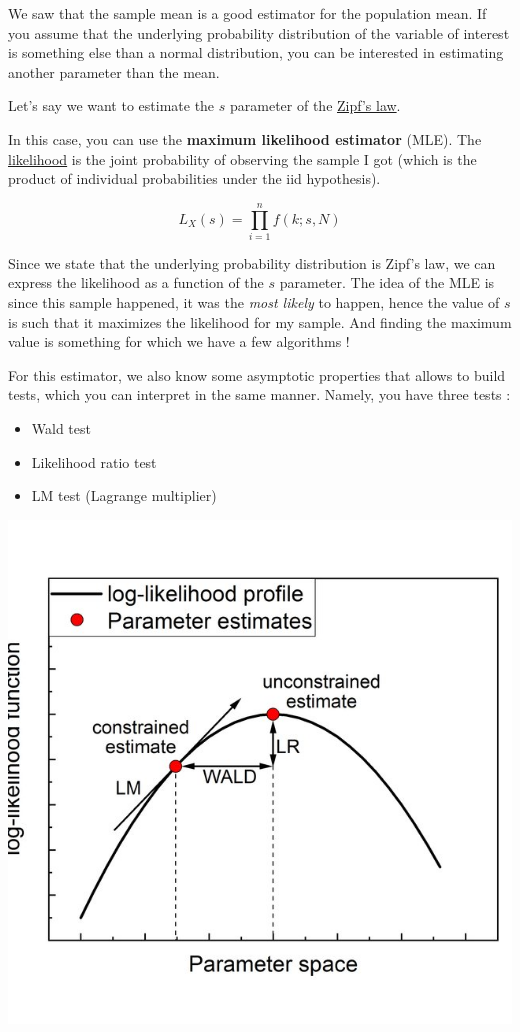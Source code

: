 \documentclass[
]{book}
\providecommand{\tightlist}{%
  \setlength{\itemsep}{0pt}\setlength{\parskip}{0pt}}
\begin{document}
We saw that the sample mean is a good estimator for the population mean. If you assume that the underlying probability distribution of the variable of interest is something else than a normal distribution, you can be interested in estimating another parameter than the mean.

Let's say we want to estimate the \(s\) parameter of the \href{https://en.wikipedia.org/wiki/Zipf\%27s_law}{Zipf's law}.

In this case, you can use the \textbf{maximum likelihood estimator} (MLE). The \href{https://en.wikipedia.org/wiki/Likelihood_function}{likelihood} is the joint probability of observing the sample I got (which is the product of individual probabilities under the iid hypothesis).

\[L_X(s) = \prod_{i=1}^n f(k;s,N)\]

Since we state that the underlying probability distribution is Zipf's law, we can express the likelihood as a function of the \(s\) parameter. The idea of the MLE is since this sample happened, it was the \emph{most likely} to happen, hence the value of \(s\) is such that it maximizes the likelihood for my sample. And finding the maximum value is something for which we have a few algorithms !

For this estimator, we also know some asymptotic properties that allows to build tests, which you can interpret in the same manner. Namely, you have three tests :

\begin{itemize}
\tightlist
\item
  Wald test
\item
  Likelihood ratio test
\item
  LM test (Lagrange multiplier)
\end{itemize}

\includegraphics{img/wald-lm-lr.jpg}
\end{document}

